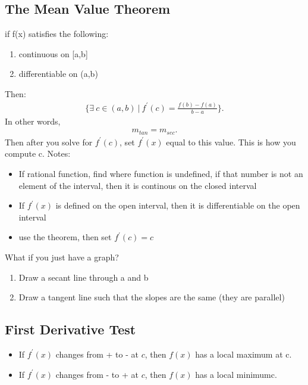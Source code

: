\documentclass{report}
\begin{document}
     \bigbreak \noindent \bigbreak \noindent 
     \subsection{The Mean Value Theorem}
      \bigbreak \noindent 
     if f(x) satisfies the following:
     \begin{enumerate}
       \item continuous on [a,b]
        \item differentiable on (a,b)
     \end{enumerate}
     \smallbreak \noindent
     Then:
     \begin{align*}
       \bigg\{\exists\ c \in (a,b)\ |\ f^{\prime}(c) = \frac{f(b)- f(a)}{b-a}\bigg\}
     .\end{align*}
     \bigbreak \noindent 
     In other words,
     \begin{align*}
       m_{tan} = m_{sec}
     .\end{align*}
     \bigbreak \noindent 
     Then after you solve for $f^{\prime}(c)$, set $f^{\prime}(x)$ equal to this value. This is how you compute c.
     \bigbreak \noindent \bigbreak \noindent
     Notes:
     \begin{itemize}
       \item If rational function, find where function is undefined, if that number is not an element of the interval, then it is continous on the closed interval
        \item If $f^{\prime}(x)$ is defined on the open interval, then it is differentiable on the open interval
        \item use the theorem, then set $f^{\prime}(c) = c$
     \end{itemize}

     \bigbreak \noindent 
     What if you just have a graph?
     \begin{enumerate}
       \item Draw a secant line through a and b
        \item Draw a tangent line such that the slopes are the same (they are parallel)
     \end{enumerate}

     \bigbreak \noindent \bigbreak \noindent 
     \subsection{First Derivative Test}
     \begin{itemize}
         \item  If $f^{\prime}(x)$ changes from + to - at $c$, then $f(x)$ has a local maximum at c.
        \item If $f^{\prime}(x)$ changes from - to + at $c$, then $f(x)$ has a local minimumc.
     \end{itemize}
\end{document}

